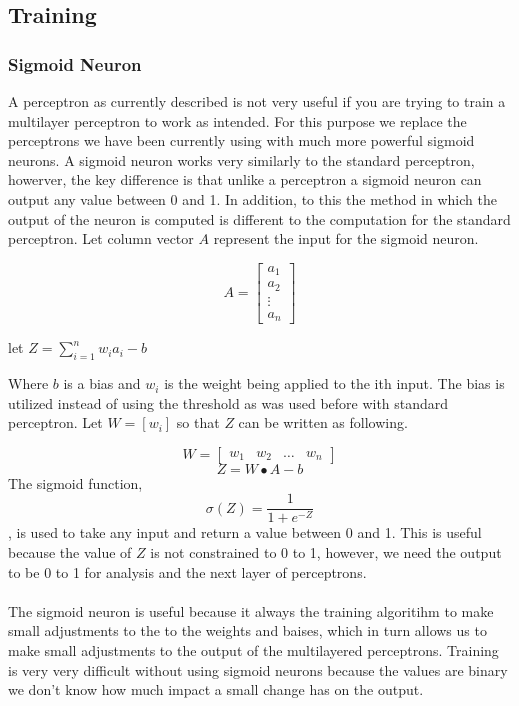 \subsection{Training}

\subsubsection{Sigmoid Neuron}

A perceptron as currently described is not very useful if you are trying to train a multilayer perceptron to work as intended. For this purpose we replace the perceptrons we have been currently using with much more powerful sigmoid neurons. A sigmoid neuron works very similarly to the standard perceptron, howerver, the key difference is that unlike a perceptron a sigmoid neuron can output any value between 0 and 1. In addition, to this the method in which the output of the neuron is computed is different to the computation for the standard perceptron. Let column vector $A$ represent the input for the sigmoid neuron.

$$
	A = 
	\begin{bmatrix}
		a_1 \\
		a_2 \\
		\vdots \\
		a_n
	\end{bmatrix}
$$
\begin{center}
	let $Z = \sum_{i=1}^{n} w_ia_i - b$
\end{center}
Where $b$ is a bias and $w_i$ is the weight being applied to the ith input. The bias is utilized instead of using the threshold as was used before with standard perceptron. Let $W=[w_i]$ so that $Z$ can be written as following.

$$	W=
	 \begin{bmatrix}
		w_1 & w_2 & \dots & w_n
	\end{bmatrix}
$$
$$	
	Z = W \bullet A - b
$$
The sigmoid function, $$\sigma(Z) = \frac{1}{1+e^{-Z}}$$, is used to take any input and return a value between 0 and 1. This is useful because the value of $Z$ is not constrained to 0 to 1, however, we need the output to be 0 to 1 for analysis and the next layer of perceptrons. \\ \\
The sigmoid neuron is useful because it always the training algoritihm to make small adjustments to the to the weights and baises, which in turn allows us to make small adjustments to the output of the multilayered perceptrons. Training is very very difficult without using sigmoid neurons because the values are binary we don't know how much impact a small change has on the output. 

